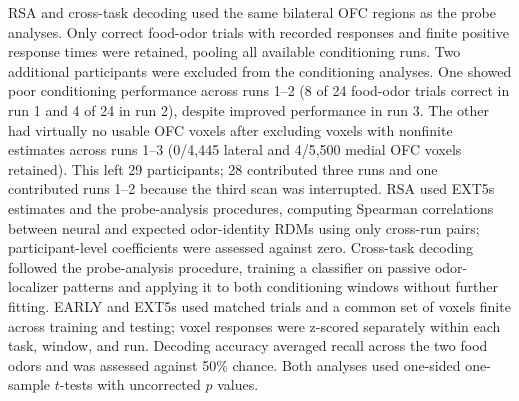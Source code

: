 \documentclass[11pt,letterpaper]{article}
\begin{document}
RSA and cross-task decoding used the same bilateral OFC regions as the probe analyses. Only correct food-odor trials with recorded responses and finite positive response times were retained, pooling all available conditioning runs. Two additional participants were excluded from the conditioning analyses. One showed poor conditioning performance across runs 1--2 (8 of 24 food-odor trials correct in run 1 and 4 of 24 in run 2), despite improved performance in run 3. The other had virtually no usable OFC voxels after excluding voxels with nonfinite estimates across runs 1--3 (0/4,445 lateral and 4/5,500 medial OFC voxels retained). This left 29 participants; 28 contributed three runs and one contributed runs 1--2 because the third scan was interrupted. RSA used EXT5s estimates and the probe-analysis procedures, computing Spearman correlations between neural and expected odor-identity RDMs using only cross-run pairs; participant-level coefficients were assessed against zero. Cross-task decoding followed the probe-analysis procedure, training a classifier on passive odor-localizer patterns and applying it to both conditioning windows without further fitting. EARLY and EXT5s used matched trials and a common set of voxels finite across training and testing; voxel responses were z-scored separately within each task, window, and run. Decoding accuracy averaged recall across the two food odors and was assessed against 50\% chance. Both analyses used one-sided one-sample $t$-tests with uncorrected $p$ values.
\end{document}
